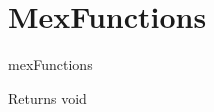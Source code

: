 \hypertarget{group__mexFunctions}{}\section{Mex\+Functions}
\label{group__mexFunctions}
mex\+Functions \begin{DoxyReturn}{Returns}
void 
\end{DoxyReturn}
